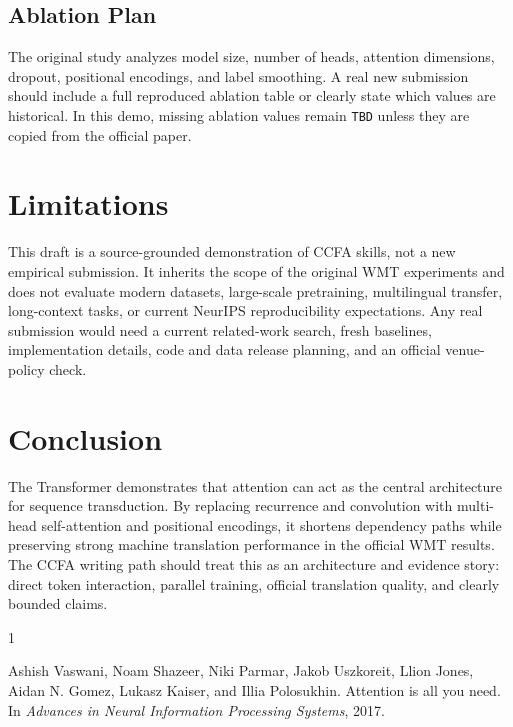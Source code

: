\documentclass{article}
\begin{document}
\subsection{Ablation Plan}

The original study analyzes model size, number of heads, attention dimensions, dropout, positional encodings, and label smoothing. A real new submission should include a full reproduced ablation table or clearly state which values are historical. In this demo, missing ablation values remain \texttt{TBD} unless they are copied from the official paper.

\section{Limitations}

This draft is a source-grounded demonstration of CCFA skills, not a new empirical submission. It inherits the scope of the original WMT experiments and does not evaluate modern datasets, large-scale pretraining, multilingual transfer, long-context tasks, or current NeurIPS reproducibility expectations. Any real submission would need a current related-work search, fresh baselines, implementation details, code and data release planning, and an official venue-policy check.

\section{Conclusion}

The Transformer demonstrates that attention can act as the central architecture for sequence transduction. By replacing recurrence and convolution with multi-head self-attention and positional encodings, it shortens dependency paths while preserving strong machine translation performance in the official WMT results. The CCFA writing path should treat this as an architecture and evidence story: direct token interaction, parallel training, official translation quality, and clearly bounded claims.

\begin{thebibliography}{1}

Ashish Vaswani, Noam Shazeer, Niki Parmar, Jakob Uszkoreit, Llion Jones,
Aidan N. Gomez, Lukasz Kaiser, and Illia Polosukhin.
\newblock Attention is all you need.
\newblock In \emph{Advances in Neural Information Processing Systems}, 2017.

\end{thebibliography}
\end{document}
